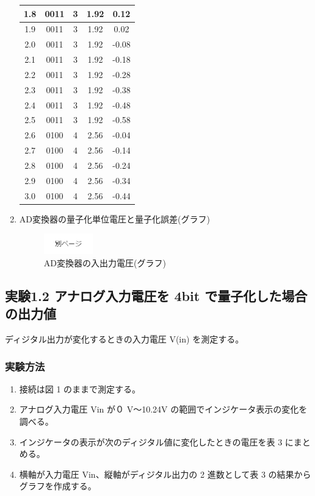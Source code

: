 \documentclass[10pt]{article}
\begin{document}
\begin{enumerate}
\begin{table}[H]
\begin{tabular}{|*{5}{c|}}
            1.8 & 0011 & 3 & 1.92 & 0.12  \\ \hline
            1.9 & 0011 & 3 & 1.92 & 0.02  \\ \hline
            2.0 & 0011 & 3 & 1.92 & -0.08 \\ \hline
            2.1 & 0011 & 3 & 1.92 & -0.18 \\ \hline
            2.2 & 0011 & 3 & 1.92 & -0.28 \\ \hline
            2.3 & 0011 & 3 & 1.92 & -0.38 \\ \hline
            2.4 & 0011 & 3 & 1.92 & -0.48 \\ \hline
            2.5 & 0011 & 3 & 1.92 & -0.58 \\ \hline
            2.6 & 0100 & 4 & 2.56 & -0.04 \\ \hline
            2.7 & 0100 & 4 & 2.56 & -0.14 \\ \hline
            2.8 & 0100 & 4 & 2.56 & -0.24 \\ \hline
            2.9 & 0100 & 4 & 2.56 & -0.34 \\ \hline
            3.0 & 0100 & 4 & 2.56 & -0.44 \\ \hline
\end{tabular}
\end{table} 
\endgroup
\pagebreak

\item AD変換器の量子化単位電圧と量子化誤差(グラフ)
	\begin{figure}[H]
		\centering
		\includegraphics[width=0.2\textwidth]{page.png}
		\caption{AD変換器の入出力電圧(グラフ)}
	\end{figure}
\end{enumerate}
\pagebreak

\subsection{実験1.2 アナログ入力電圧を 4bit で量子化した場合の出力値}
ディジタル出力が変化するときの入力電圧 V(in) を測定する。

\subsubsection{実験方法}

\begin{enumerate}
 \item 接続は図 1 のままで測定する。
 \item アナログ入力電圧 Vin が０ V～10.24V の範囲でインジケータ表示の変化を調べる。
 \item インジケータの表示が次のディジタル値に変化したときの電圧を表 3 にまとめる。
 \item 横軸が入力電圧 Vin、縦軸がディジタル出力の 2 進数として表 3 の結果からグラフを作成する。
\end{enumerate}
\end{document}
